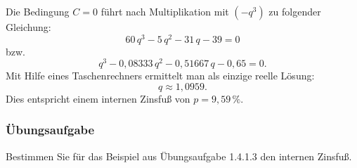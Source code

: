 Die Bedingung $C = 0$ führt nach Multiplikation mit $(-q^3)$ zu folgender Gleichung:
\[ 60\,q^3 - 5\,q^2 - 31\,q - 39 = 0 \]
bzw.
\[ q^3 - 0{,}08333\,q^2 - 0{,}51667\,q - 0{,}65 = 0 . \]
Mit Hilfe eines Taschenrechners ermittelt man als einzige reelle Lösung:
\[ q \approx 1{,}0959 . \]
Dies entspricht einem internen Zinsfuß von $p = 9{,}59\,\%$.\beispielende

\subsubsection{Übungsaufgabe}

\begin{graukasten}
  Bestimmen Sie für das Beispiel aus Übungsaufgabe 1.4.1.3 den internen Zinsfuß.
\end{graukasten}
